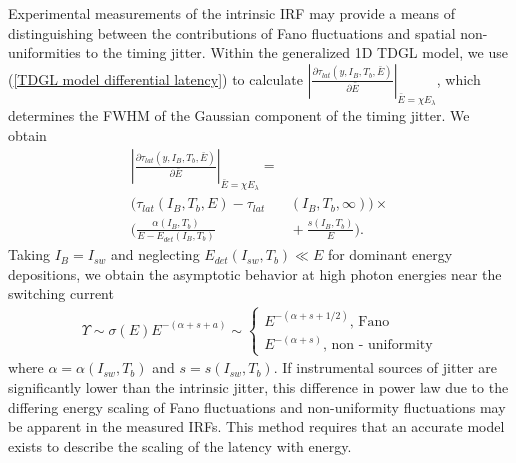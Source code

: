\documentclass[%
reprint,
 amsmath,amssymb,
aps,
pra,
]{revtex4-1}
\begin{document}
\quad Experimental measurements of the intrinsic IRF may provide a means of distinguishing between the contributions of Fano fluctuations and spatial non-uniformities to the timing jitter.  Within the generalized 1D TDGL model, we use (\ref{TDGL model differential latency}) to calculate \({\left|\frac{\partial\tau_{lat}\left(y, I_B,T_b,\bar{E}\right)}{\partial \bar{E}} \right|}_{\bar{E}=\chi E_\lambda }\), which determines the FWHM of the Gaussian component of the timing jitter.  We obtain
\begin{equation}\label{tau lat derivative}
\begin{aligned}
\left|\frac{\partial\tau_{lat}\left(y, I_B,T_b,\bar{E}\right)}{\partial \bar{E}} \right|_{\bar{E}=\chi E_\lambda} = {}&\\
\big(\tau_{lat}\left(I_B,T_b,E\right) - \tau_{lat}&\left(I_B,T_b,\infty\right)\big)\times \\
\Bigg(\frac{\alpha\left(I_B,T_b\right)}{E - E_{det}\left(I_B, T_b\right)} &{}+ \frac{s \left(I_B,T_b\right)}{E}\Bigg).
\end{aligned}
\end{equation}
Taking \(I_B = I_{sw}\) and neglecting \(E_{det}\left(I_{sw},T_b\right) \ll E\) for dominant energy depositions, we obtain the asymptotic behavior at high photon energies near the switching current
\begin{equation}\label{FWHM asymptotic}
\begin{aligned}
\Upsilon \sim \sigma\left(E\right)E^{-\left(\alpha + s + a\right)}\sim
\left\lbrace 
\begin{array}{ll}
                  E^{-\left(\alpha+s+1/2\right)} \text{, Fano}\\
                  E^{-\left(\alpha+s\right)} \text{, non - uniformity}\end{array}
\right.
\end{aligned}     
\end{equation}
where \(\alpha =\alpha \left(I_{sw},T_b\right) \) and  \(s=s\left(I_{sw},T_b\right) \).  If instrumental sources of jitter are significantly lower than the intrinsic jitter, this difference in power law due to the differing energy scaling of Fano fluctuations and non-uniformity fluctuations may be apparent in the measured IRFs.  This method requires that an accurate model exists to describe the scaling of the latency with energy. 
\end{document}

